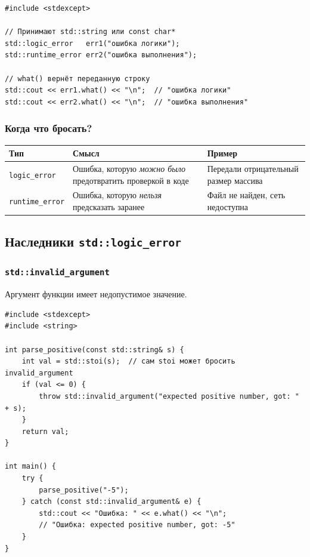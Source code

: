 \documentclass[a4paper,12pt]{article}
\begin{document}
\begin{lstlisting}
#include <stdexcept>

// Принимают std::string или const char*
std::logic_error   err1("ошибка логики");
std::runtime_error err2("ошибка выполнения");

// what() вернёт переданную строку
std::cout << err1.what() << "\n";  // "ошибка логики"
std::cout << err2.what() << "\n";  // "ошибка выполнения"
\end{lstlisting}

\subsubsection{Когда что бросать?}

\begin{center}
\begin{tabular}{lp{5cm}p{5cm}}
\toprule
\textbf{Тип} & \textbf{Смысл} & \textbf{Пример} \\
\midrule
\texttt{logic\_error}
    & Ошибка, которую \textit{можно было} предотвратить проверкой в коде
    & Передали отрицательный размер массива \\
\addlinespace
\texttt{runtime\_error}
    & Ошибка, которую \textit{нельзя} предсказать заранее
    & Файл не найден, сеть недоступна \\
\bottomrule
\end{tabular}
\end{center}

\subsection{Наследники \texttt{std::logic\_error}}

\subsubsection{\texttt{std::invalid\_argument}}

Аргумент функции имеет недопустимое значение.

\begin{lstlisting}
#include <stdexcept>
#include <string>

int parse_positive(const std::string& s) {
    int val = std::stoi(s);  // сам stoi может бросить invalid_argument
    if (val <= 0) {
        throw std::invalid_argument("expected positive number, got: " + s);
    }
    return val;
}

int main() {
    try {
        parse_positive("-5");
    } catch (const std::invalid_argument& e) {
        std::cout << "Ошибка: " << e.what() << "\n";
        // "Ошибка: expected positive number, got: -5"
    }
}
\end{lstlisting}
\end{document}
